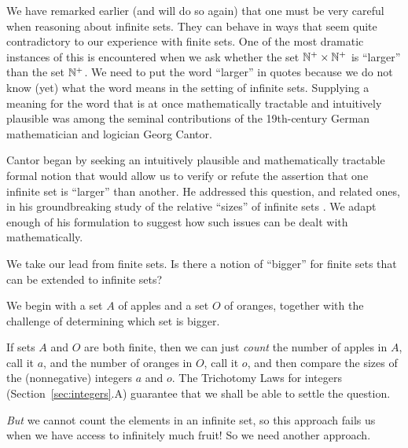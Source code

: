 We have remarked earlier (and will do so again) that one must be very
careful when reasoning about infinite sets.  They can behave in ways
that seem quite contradictory to our experience with finite sets.  One
of the most dramatic instances of this is encountered when we ask
whether the set $\mathbb{N}^+ \times \mathbb{N}^+$ is ``larger'' than the set $\mathbb{N}^+$.
We need to put the word ``larger'' in quotes because we do not know
(yet) what the word means in the setting of infinite sets.  Supplying
a meaning for the word that is at once mathematically tractable and
intuitively plausible was among the seminal contributions of the
19th-century German mathematician and logician Georg
Cantor. 


    

Cantor began by seeking an intuitively plausible and mathematically
tractable formal notion that would allow us to verify or refute the
assertion that one infinite set is ``larger'' than another.  He
addressed this question, and related ones, in his groundbreaking study
of the relative ``sizes'' of infinite sets \cite{Cantor74,Cantor78}.
We adapt enough of his formulation to suggest how such issues can be
dealt with mathematically.

We take our lead from finite sets.  Is there a notion of ``bigger''
for finite sets that can be extended to infinite sets?

We begin with a set $A$ of apples and a set $O$ of oranges, together
with the challenge of determining which set is bigger.

\medskip

If sets $A$ and $O$ are both finite, then we can just {\em count} the
number of apples in $A$, call it $a$, and the number of oranges in
$O$, call it $o$, and then compare the sizes of the (nonnegative)
integers $a$ and $o$.  The Trichotomy Laws for integers
(Section~\ref{sec:integers}.A) guarantee that we shall be able to
settle the question.

\noindent
{\em But} we cannot count the elements in an infinite set, so this
approach fails us when we have access to infinitely much fruit!  So we
need another approach.

